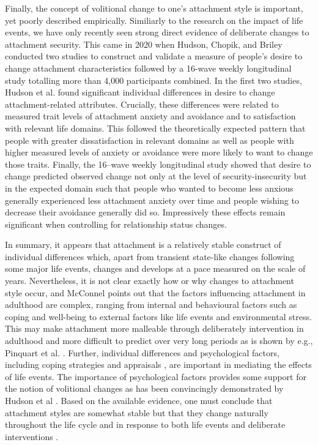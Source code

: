 \documentclass[12pt]{report}
\begin{document}
Finally, the concept of volitional change to one's attachment style is important, yet poorly described empirically. Similiarly to the research on the impact of life events, we have only recently seen strong direct evidence of deliberate changes to attachment security. This came in 2020 when Hudson, Chopik, and Briley \cite{Hudson2020} conducted two studies to construct and validate a measure of people's desire to change attachment characteristics followed by a 16-wave weekly longitudinal study totalling more than 4,000 participants combined.
In the first two studies, Hudson et al. found significant individual differences in desire to change attachment-related attributes. Crucially, these differences were related to measured trait levels of attachment anxiety and avoidance and to satisfaction with relevant life domains. This followed the theoretically expected pattern that people with greater dissatisfaction in relevant domains as well as people with higher measured levels of anxiety or avoidance were more likely to want to change those traits.
Finally, the 16–wave weekly longitudinal study showed that desire to change predicted observed change not only at the level of security-insecurity but in the expected domain such that people who wanted to become less anxious generally experienced less attachment anxiety over time and people wishing to decrease their avoidance generally did so. Impressively these effects remain significant when controlling for relationship status changes.


In summary, it appears that attachment is a relatively stable construct of individual differences which, apart from transient state-like changes following some major life events, changes and develops at a pace measured on the scale of years. Nevertheless, it is not clear exactly how or why changes to attachment style occur, and McConnel \cite{McConnell2011} points out that the factors influencing attachment in adulthood are complex, ranging from internal and behavioural factors such as coping and well-being to external factors like life events and environmental stress. This may make attachment more malleable through deliberately intervention in adulthood and more difficult to predict over very long periods as is shown by e.g., Pinquart et al. \cite{Pinquart2013}.
Further, individual differences and psychological factors, including coping strategies \cite{Zhang2004} and appraisals \cite{Fraley2021}, are important in mediating the effects of life events. The importance of psychological factors provides some support for the notion of volitional changes as has been convincingly demonstrated by Hudson et al \cite{Hudson2020}.
Based on the available evidence, one must conclude that attachment styles are somewhat stable but that they change naturally throughout the life cycle \cite{Rowe2005,Doherty2004,Fraley1997} and in response to both life events \cite{Fraley2021} and deliberate interventions \cite{Hudson2020}.
\end{document}
